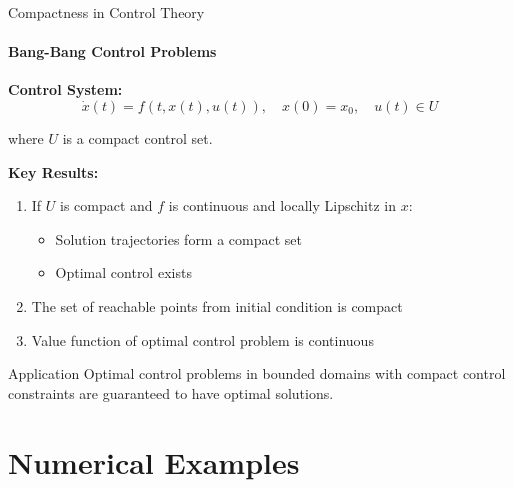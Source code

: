 \documentclass[aspectratio=169,10pt]{beamer}
\theoremstyle{definition}
\begin{document}
\begin{frame}{Compactness in Control Theory}
\framesubtitle{Bang-Bang Control Problems}

\textbf{Control System:}
\begin{equation*}
\dot{x}(t) = f(t, x(t), u(t)), \quad x(0) = x_0, \quad u(t) \in U
\end{equation*}

where $U$ is a compact control set.

\vspace{0.3cm}

\textbf{Key Results:}
\begin{enumerate}
    \item If $U$ is compact and $f$ is continuous and locally Lipschitz in $x$:
    \begin{itemize}
        \item Solution trajectories form a compact set
        \item Optimal control exists
    \end{itemize}

    \item The set of reachable points from initial condition is compact

    \item Value function of optimal control problem is continuous
\end{enumerate}

\vspace{0.3cm}

\begin{block}{Application}
Optimal control problems in bounded domains with compact control constraints are guaranteed to have optimal solutions.
\end{block}
\end{frame}

\section{Numerical Examples}
\end{document}
